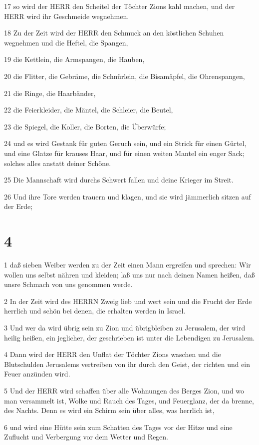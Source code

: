 \par 17 so wird der HERR den Scheitel der Töchter Zions kahl machen, und der HERR wird ihr Geschmeide wegnehmen.
\par 18 Zu der Zeit wird der HERR den Schmuck an den köstlichen Schuhen wegnehmen und die Heftel, die Spangen,
\par 19 die Kettlein, die Armspangen, die Hauben,
\par 20 die Flitter, die Gebräme, die Schnürlein, die Bisamäpfel, die Ohrenspangen,
\par 21 die Ringe, die Haarbänder,
\par 22 die Feierkleider, die Mäntel, die Schleier, die Beutel,
\par 23 die Spiegel, die Koller, die Borten, die Überwürfe;
\par 24 und es wird Gestank für guten Geruch sein, und ein Strick für einen Gürtel, und eine Glatze für krauses Haar, und für einen weiten Mantel ein enger Sack; solches alles anstatt deiner Schöne.
\par 25 Die Mannschaft wird durchs Schwert fallen und deine Krieger im Streit.
\par 26 Und ihre Tore werden trauern und klagen, und sie wird jämmerlich sitzen auf der Erde;

\chapter{4}

\par 1 daß sieben Weiber werden zu der Zeit einen Mann ergreifen und sprechen: Wir wollen uns selbst nähren und kleiden; laß uns nur nach deinen Namen heißen, daß unsre Schmach von uns genommen werde.
\par 2 In der Zeit wird des HERRN Zweig lieb und wert sein und die Frucht der Erde herrlich und schön bei denen, die erhalten werden in Israel.
\par 3 Und wer da wird übrig sein zu Zion und übrigbleiben zu Jerusalem, der wird heilig heißen, ein jeglicher, der geschrieben ist unter die Lebendigen zu Jerusalem.
\par 4 Dann wird der HERR den Unflat der Töchter Zions waschen und die Blutschulden Jerusalems vertreiben von ihr durch den Geist, der richten und ein Feuer anzünden wird.
\par 5 Und der HERR wird schaffen über alle Wohnungen des Berges Zion, und wo man versammelt ist, Wolke und Rauch des Tages, und Feuerglanz, der da brenne, des Nachts. Denn es wird ein Schirm sein über alles, was herrlich ist,
\par 6 und wird eine Hütte sein zum Schatten des Tages vor der Hitze und eine Zuflucht und Verbergung vor dem Wetter und Regen.

